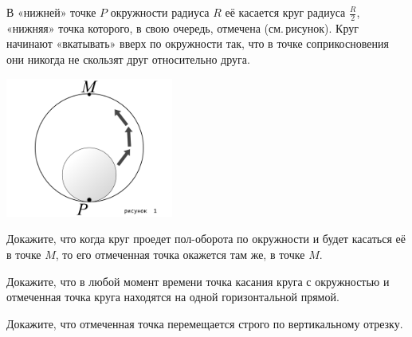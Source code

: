 ﻿
\noindent В «нижней» точке $P$ окружности радиуса $R$ её касается круг радиуса $\tfrac{R}{2}$, «нижняя» точка которого, в свою очередь, отмечена (см.\,рисунок). Круг начинают «вкатывать» вверх по окружности так, что в точке соприкосновения они никогда не скользят друг относительно друга.

\centerline{\includegraphics[width=5.5cm]{stats/2018/images/circle-move}}

\begin{enumerate}
\itA Докажите, что когда круг проедет пол-оборота по окружности и будет касаться её в точке $M$, то его отмеченная точка окажется там же, в точке $M$.

\itB Докажите, что в любой момент времени точка касания круга с окружностью и отмеченная точка круга находятся на одной горизонтальной прямой.

\itC Докажите, что отмеченная точка перемещается строго по вертикальному отрезку.
\end{enumerate}